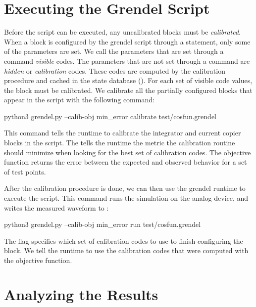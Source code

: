 \section{Executing the Grendel Script}

Before the  script can be executed, any uncalibrated blocks
must be \textit{calibrated}. When a block is configured by the grendel script
through a  statement, only some of the parameters are set. We call the
parameters that are set through a \grendel command \textit{visible} codes. The
parameters that are not set through a \grendel command are \textit{hidden}
or \textit{calibration} codes. These codes are computed by the calibration
procedure and cached in the state database (). For each set of
visible code values, the block must be calibrated. We calibrate all the
partially configured blocks that appear in the  script with the
following command:


\begin{snippet}
python3 grendel.py --calib-obj min_error calibrate test/cosfun.grendel
\end{snippet}

This command tells the \grendel runtime to calibrate the integrator and current
copier blocks in the script. The  tells the \grendel runtime the
metric the calibration routine should minimize when looking for the best set of
calibration codes. The  objective function returns the error
between the expected and observed behavior for a set of test points.

After the calibration procedure is done, we can then use the grendel runtime to
execute the script. This command runs the simulation on the analog device, and
writes the measured waveform to :

\begin{snippet}
python3 grendel.py --calib-obj min_error run test/cosfun.grendel
\end{snippet}

The  flag specifies which set of calibration codes to use to finish
configuring the block. We tell the \grendel runtime to use the calibration codes
that were computed with the  objective function.

\section{Analyzing the Results}

